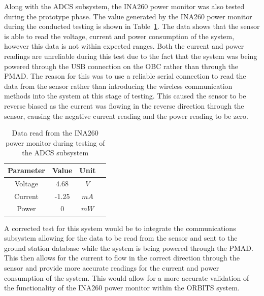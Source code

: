 \documentclass[a4paper,12pt,titlepage]{report}
\begin{document}
Along with the ADCS subsystem, the INA260 power monitor was also tested during the prototype phase. The value generated by the INA260 power monitor during the conducted testing is shown in Table~\ref{tab:ina260_test}. The data shows that the sensor is able to read the voltage, current and power consumption of the system, however this data is not within expected ranges. Both the current and power readings are unreliable during this test due to the fact that the system was being powered through the USB connection on the OBC rather than through the PMAD. The reason for this was to use a reliable serial connection to read the data from the sensor rather than introducing the wireless communication methods into the system at this stage of testing. This caused the sensor to be reverse biased as the current was flowing in the reverse direction through the sensor, causing the negative current reading and the power reading to be zero.

\begin{table}[h]
\centering
\caption{Data read from the INA260 power monitor during testing of the ADCS subsystem}
\begin{tabular}{|c|c|c|c|}
\hline
\textbf{Parameter}& \textbf{Value} & \textbf{Unit} \\ \hline
Voltage &  4.68 & \(V\) \\
Current &  -1.25 & \(mA\) \\
Power &  0 & \(mW\) \\ \hline
\end{tabular}
\label{tab:ina260_test}
\end{table}

A corrected test for this system would be to integrate the communications subsystem allowing for the data to be read from the sensor and sent to the ground station database while the system is being powered through the PMAD. This then allows for the current to flow in the correct direction through the sensor and provide more accurate readings for the current and power consumption of the system. This would allow for a more accurate validation of the functionality of the INA260 power monitor within the ORBITS system.
\end{document}
